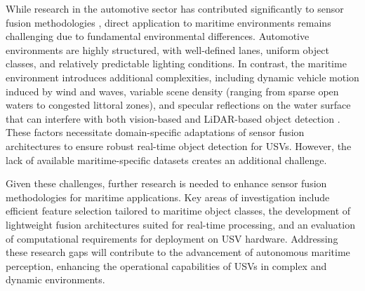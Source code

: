 \documentclass{erauthesis}
\begin{document}
While research in the automotive sector has contributed significantly to sensor fusion methodologies \cite{yeong2021,clunie2021,roriz2022,cui2022,das2022,liu2023a}, direct application to maritime environments remains challenging due to fundamental environmental differences. 
Automotive environments are highly structured, with well-defined lanes, uniform object classes, and relatively predictable lighting conditions. 
In contrast, the maritime environment introduces additional complexities, including dynamic vehicle motion induced by wind and waves, variable scene density (ranging from sparse open waters to congested littoral zones), and specular reflections on the water surface that can interfere with both vision-based \cite{liu2023a} and LiDAR-based object detection \cite{ahmed2024}.%
These factors necessitate domain-specific adaptations of sensor fusion architectures to ensure robust real-time object detection for USVs. 
However, the lack of available maritime-specific datasets \cite{jun-hwa2022,su2023,thompson2023} creates an additional challenge.

Given these challenges, further research is needed to enhance sensor fusion methodologies for maritime applications. 
Key areas of investigation include efficient feature selection tailored to maritime object classes, the development of lightweight fusion architectures suited for real-time processing, and an evaluation of computational requirements for deployment on USV hardware. 
Addressing these research gaps will contribute to the advancement of autonomous maritime perception, enhancing the operational capabilities of USVs in complex and dynamic environments.




\end{document}

